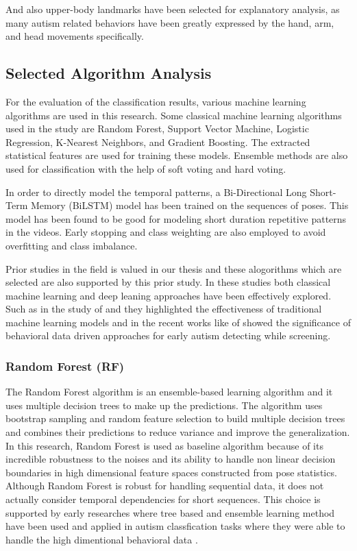And also upper-body landmarks have been selected for explanatory analysis, as many autism related behaviors have been greatly expressed by the hand, arm, and head movements specifically.

\subsection{Selected Algorithm Analysis}

For the evaluation of the classification results, various machine learning algorithms are used in this research. Some classical machine learning algorithms used in the study are Random Forest, Support Vector Machine, Logistic Regression, K-Nearest Neighbors, and Gradient Boosting. The extracted statistical features are used for training these models. Ensemble methods are also used for classification with the help of soft voting and hard voting.

In order to directly model the temporal patterns, a Bi-Directional Long Short-Term Memory (BiLSTM) model has been trained on the sequences of poses. This model has been found to be good for modeling short duration repetitive patterns in the videos. Early stopping and class weighting are also employed to avoid overfitting and class imbalance.

Prior studies in the field is valued in our thesis and these alogorithms which are selected are also supported by this prior study. In these studies both classical machine learning and deep leaning approaches have been effectively explored. Such as in the study of \cite{thabtah2018machine} and \cite{duda2016use} they highlighted the effectiveness of traditional machine learning models and in the recent works like of \cite{perochon2023digital} showed the significance of behavioral data driven approaches for early autism detecting while screening.


\subsubsection{Random Forest (RF)}
The Random Forest algorithm is an ensemble-based learning algorithm and it uses multiple decision trees to make up the predictions. The algorithm uses bootstrap sampling and random feature selection to build multiple decision trees and combines their predictions to reduce variance and improve the generalization. In this research, Random Forest is used as baseline algorithm because of its incredible robustness to the noises and its ability to handle non linear decision boundaries in high dimensional feature spaces constructed from pose statistics. Although Random Forest is robust for handling sequential data, it does not actually consider temporal dependencies for short sequences. This choice is supported by early researches where tree based and ensemble learning method have been used and applied in autism classfication tasks where they were able to handle the high dimentional behavioral data \cite{thabtah2018machine,duda2016use}.
